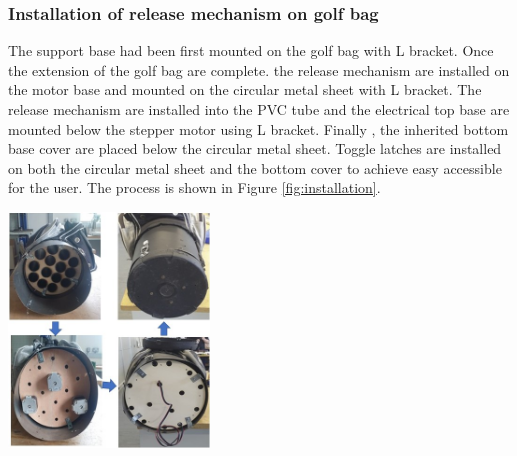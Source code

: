 \documentclass[11pt,landscape]{article}
\newenvironment{Figure}
  {\par\medskip\noindent\minipage{\linewidth}}
  {\endminipage\par\medskip}
\begin{document}
\begin{multicols}{3}
    \subsubsection{Installation of release mechanism on golf bag }
    The support base had been first mounted on the golf bag with L bracket. Once
    the extension of the golf bag are complete. the release mechanism are
    installed on the motor base and mounted on the circular metal sheet with L
    bracket. The release mechanism are installed into the PVC tube and the
    electrical top base are mounted below the stepper motor using L bracket.
    Finally , the inherited bottom base cover are placed below the circular
    metal sheet. Toggle latches are installed on both the circular metal sheet
    and the bottom cover to achieve easy accessible for the user. The process is
    shown in Figure \ref{fig:installation}.
    \begin{Figure}
        \begin{center}
            \includegraphics[width=0.4\textwidth]{Figure30.jpg}
            \label{fig:installation}
        \end{center}
    \end{Figure}
\end{multicols}
\end{document}
